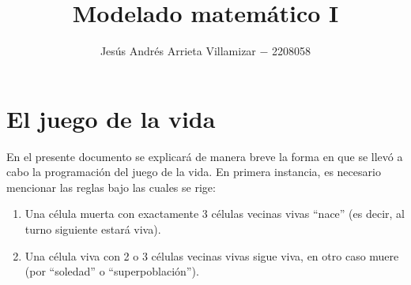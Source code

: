 \documentclass[11pt]{iopart}
\begin{document}
\title{Modelado matemático I}

\author{Jesús Andrés Arrieta Villamizar $-$ 2208058}
\address{$^1$  Escuela de F\'isica, Universidad Industrial de Santander.}

\section*{El juego de la vida}

En el presente documento se explicará de manera breve la forma en que se llevó a cabo la programación del juego de la vida. En primera instancia, es necesario mencionar las reglas bajo las cuales se rige:
%
\begin{enumerate}
\item Una célula muerta con exactamente 3 células vecinas vivas “nace” (es decir, al turno siguiente estará viva).
\item Una célula viva con 2 o 3 células vecinas vivas sigue viva, en otro caso muere (por “soledad” o “superpoblación”).
\end{enumerate}
\end{document}
